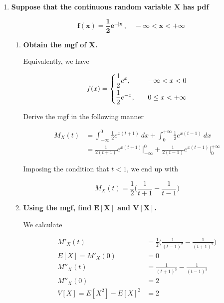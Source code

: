 \documentclass[10pt, oneside]{article}
\begin{document}
\begin{enumerate}[label=10.\arabic*]
\item  \begin{tcolorbox}[
  colback=Cerulean!5!white,
  colframe=Cerulean!75!black]
\textbf{Suppose that the continuous random variable $\bm{X}$ has pdf}

\[ \bm{f(x) = \frac{1}{2} e^{-|x|}, \quad -\infty < x < +\infty} \]
\end{tcolorbox}

	\begin{enumerate}
	\item  \begin{tcolorbox}[
	  colback=Cerulean!5!white,
	  colframe=Cerulean!75!black]
	\textbf{Obtain the mgf of $\bm{X}$.}
	\end{tcolorbox}
	
	Equivalently, we have
	
	\[ f(x) = \begin{dcases}
	\frac{1}{2} e^x, & \quad -\infty < x < 0 \\
	\frac{1}{2} e^{-x}, & \quad 0 \leq x < +\infty
	\end{dcases}
	\]
	
	Derive the mgf in the following manner
	
	\begin{align*}
	M_X(t) &= \int^0_{-\infty} \frac{1}{2} e^{x(t+1)} \ dx + \int^{+\infty}_0 \frac{1}{2} e^{x(t-1)} \ dx \\
	&= \frac{1}{2(t+1)} e^{x(t+1)} \bigg|^0_{-\infty} + \frac{1}{2(t-1)} e^{x(t-1)} \bigg|^{+\infty}_0
	\end{align*}
	
	Imposing the condition that $t < 1$, we end up with
	
	\[ \boxed{ M_X(t) = \frac{1}{2} \bigg( \frac{1}{t+1} - \frac{1}{t-1} \bigg) } \]
	
	\item  \begin{tcolorbox}[
	  colback=Cerulean!5!white,
	  colframe=Cerulean!75!black]
	\textbf{Using the mgf, find $\bm{E[X]}$ and $\bm{V[X]}$.}
	\end{tcolorbox}
	
	We calculate
	
	\begin{align*}
	M'_X(t) &= \frac{1}{2} \bigg( \frac{1}{(t-1)^2} - \frac{1}{(t+1)^2} \bigg) \\
	E[X] = M'_X(0) &= \boxed{0} \\
	M''_X(t) &= \frac{1}{(t+1)^3} - \frac{1}{(t-1)^3} \\
	M''_X(0) &= 2 \\
	V[X] = E[X^2] - E[X]^2 &= \boxed{2}
	\end{align*}
	

\end{enumerate}
\end{enumerate}
\end{document}
